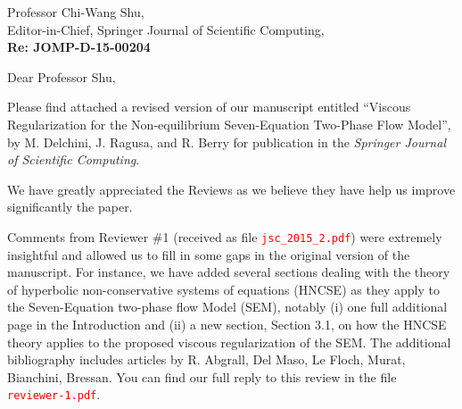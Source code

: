 \documentclass[11pt]{letter}
\newcommand{\tcr}[1]{\textcolor{red}{#1}}
\begin{document}
\begin{letter}{Professor Chi-Wang Shu, \\  Editor-in-Chief, Springer Journal of Scientific Computing,\\
\textbf{Re: JOMP-D-15-00204}}


\date{\today}

\opening{Dear Professor Shu,}
         \vspace{0.25cm}

Please find attached  a revised version of our manuscript entitled
``Viscous Regularization for the Non-equilibrium Seven-Equation Two-Phase Flow Model'',
by M. Delchini, J. Ragusa, and R. Berry for publication in the {\it  Springer Journal of Scientific Computing}. 

We have greatly appreciated the Reviews as we believe they have help us improve significantly the paper. 

Comments from Reviewer \#1 (received as file \tcr{{\tt jsc\_2015\_2.pdf}}) were extremely insightful and allowed
us to fill in some gaps in the original version of the manuscript. For instance, we have added several sections
dealing with the theory of hyperbolic non-conservative systems of equations (HNCSE) as they apply to the 
Seven-Equation two-phase flow Model (SEM), notably (i) one full additional page in the Introduction and 
(ii) a new section, Section 3.1, on how the HNCSE theory applies to the proposed viscous regularization of the SEM.
The additional bibliography includes articles by R. Abgrall, Del Maso, Le Floch, Murat, Bianchini, Bressan. You can find 
our full reply to this review in the file \tcr{{\tt reviewer-1.pdf}}.



\end{letter}
\end{document}
